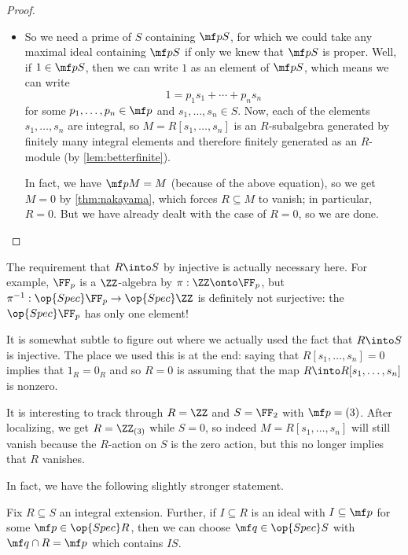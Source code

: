 \begin{proof}
\begin{itemize}
		\item So we need a prime of $S$ containing $\mf pS$, for which we could take any maximal ideal containing $\mf pS$ if only we knew that $\mf pS$ is proper. Well, if $1\in\mf pS$, then we can write $1$ as an element of $\mf pS$, which means we can write
		\[1=p_1s_1+\cdots+p_ns_n\]
		for some $p_1,\ldots,p_n\in\mf p$ and $s_1,\ldots,s_n\in S$. Now, each of the elements $s_1,\ldots,s_n$ are integral, so $M=R[s_1,\ldots,s_n]$ is an $R$-subalgebra generated by finitely many integral elements and therefore finitely generated as an $R$-module (by \autoref{lem:betterfinite}).
		
		In fact, we have $\mf pM=M$ (because of the above equation), so we get $M=0$ by \autoref{thm:nakayama}, which forces $R\subseteq M$ to vanish; in particular, $R=0$. But we have already dealt with the case of $R=0$, so we are done.
		\qedhere
	\end{itemize}
\end{proof}
\begin{remark}[Nir]
	The requirement that $R\into S$ by injective is actually necessary here. For example, $\FF_p$ is a $\ZZ$-algebra by $\pi:\ZZ\onto\FF_p$, but $\pi^{-1}:\op{Spec}\FF_p\to\op{Spec}\ZZ$ is definitely not surjective: the $\op{Spec}\FF_p$ has only one element!
\end{remark}
\begin{remark}[Nir]
	It is somewhat subtle to figure out where we actually used the fact that $R\into S$ is injective. The place we used this is at the end: saying that $R[s_1,\ldots,s_n]=0$ implies that $1_R=0_R$ and so $R=0$ is assuming that the map $R\into R[s_1,\ldots,s_n]$ is nonzero.
	
	It is interesting to track through $R=\ZZ$ and $S=\FF_2$ with $\mf p=(3)$. After localizing, we get $R=\ZZ_{(3)}$ while $S=0$, so indeed $M=R[s_1,\ldots,s_n]$ will still vanish because the $R$-action on $S$ is the zero action, but this no longer implies that $R$ vanishes.
\end{remark}
In fact, we have the following slightly stronger statement.
\begin{corollary}
	Fix $R\subseteq S$ an integral extension. Further, if $I\subseteq R$ is an ideal with $I\subseteq\mf p$ for some $\mf p\in\op{Spec}R$, then we can choose $\mf q\in\op{Spec}S$ with $\mf q\cap R=\mf p$ which contains $IS$.
\end{corollary}
